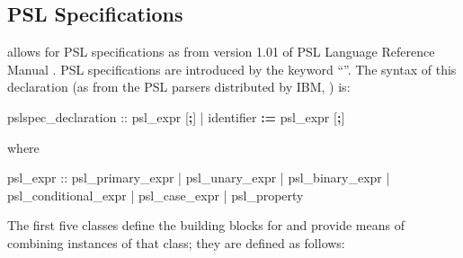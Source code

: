 \subsection{PSL Specifications}
\label{PSL Specifications}
%
\nusmv allows for PSL specifications as from version 1.01 of PSL
Language Reference Manual \cite{PSLLRM}. PSL specifications
are introduced by the keyword ``''. The syntax of this
declaration (as from the PSL parsers distributed by IBM, \cite{PSLparser}) is:
%
\begin{Grammar}
pslspec_declaration ::  psl_expr [\textbf{;}]
                     |   identifier \textbf{:=} psl_expr [\textbf{;}]
\end{Grammar}
%
where
%
\begin{Grammar}
psl_expr ::
   psl_primary_expr
 | psl_unary_expr
 | psl_binary_expr
 | psl_conditional_expr
 | psl_case_expr
 | psl_property
\end{Grammar}
%
The first five classes define the building blocks for
 and provide means of combining
instances of that class; they are defined as follows:

